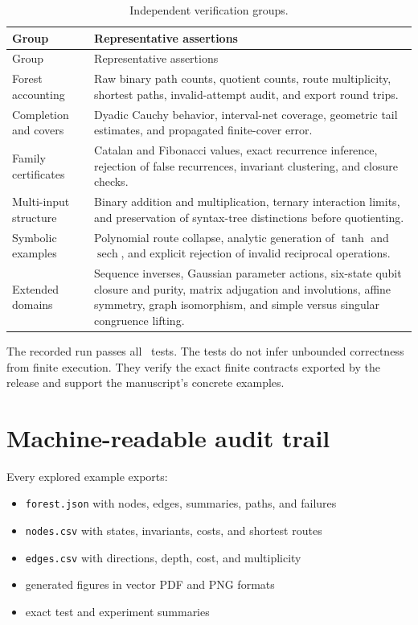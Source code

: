 \documentclass[11pt,openany]{report}
\theoremstyle{definition}
\theoremstyle{remark}
\begin{document}
\begin{longtable}{L{0.25\textwidth}L{0.64\textwidth}}
\caption{Independent verification groups.}\label{tab:test-groups}\\
\toprule
Group & Representative assertions \\
\midrule
\endfirsthead
\toprule
Group & Representative assertions \\
\midrule
\endhead
Forest accounting & Raw binary path counts, quotient counts, route multiplicity, shortest paths, invalid-attempt audit, and export round trips.\\
Completion and covers & Dyadic Cauchy behavior, interval-net coverage, geometric tail estimates, and propagated finite-cover error.\\
Family certificates & Catalan and Fibonacci values, exact recurrence inference, rejection of false recurrences, invariant clustering, and closure checks.\\
Multi-input structure & Binary addition and multiplication, ternary interaction limits, and preservation of syntax-tree distinctions before quotienting.\\
Symbolic examples & Polynomial route collapse, analytic generation of $\tanh$ and $\operatorname{sech}$, and explicit rejection of invalid reciprocal operations.\\
Extended domains & Sequence inverses, Gaussian parameter actions, six-state qubit closure and purity, matrix adjugation and involutions, affine symmetry, graph isomorphism, and simple versus singular congruence lifting.\\
\bottomrule
\end{longtable}

The recorded run passes all \TestCount\ tests. The tests do not infer unbounded correctness from finite execution. They verify the exact finite contracts exported by the release and support the manuscript's concrete examples.

\section{Machine-readable audit trail}

Every explored example exports:

\begin{itemize}
\item \texttt{forest.json} with nodes, edges, summaries, paths, and failures
\item \texttt{nodes.csv} with states, invariants, costs, and shortest routes
\item \texttt{edges.csv} with directions, depth, cost, and multiplicity
\item generated figures in vector PDF and PNG formats
\item exact test and experiment summaries
\end{itemize}
\end{document}
